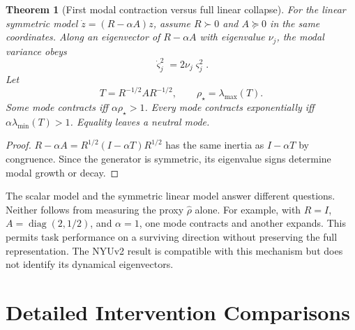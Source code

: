 \documentclass{article}
\newtheorem{theorem}{Theorem}
\begin{document}
\begin{theorem}[First modal contraction versus full linear collapse]\label{thm:spectral}
For the linear symmetric model $\dot z=(R-\alpha A)z$, assume $R\succ0$ and $A\succeq0$ in the same coordinates. Along an eigenvector of $R-\alpha A$ with eigenvalue $\nu_j$, the modal variance obeys
\begin{equation}
\dot\varsigma_j^2=2\nu_j\varsigma_j^2.
\label{eq:modal}
\end{equation}
Let
\begin{equation}
T=R^{-1/2}AR^{-1/2},\qquad \rho_\star=\lambda_{\max}(T).
\label{eq:spectral}
\end{equation}
Some mode contracts iff $\alpha\rho_\star>1$. Every mode contracts exponentially iff $\alpha\lambda_{\min}(T)>1$. Equality leaves a neutral mode.
\end{theorem}
\begin{proof}
$R-\alpha A=R^{1/2}(I-\alpha T)R^{1/2}$ has the same inertia as $I-\alpha T$ by congruence. Since the generator is symmetric, its eigenvalue signs determine modal growth or decay.
\end{proof}


The scalar model and the symmetric linear model answer different questions.
Neither follows from measuring the proxy $\hat\rho$ alone. For example, with
$R=I$, $A=\operatorname{diag}(2,1/2)$, and $\alpha=1$, one mode contracts and
another expands. This permits task performance on a surviving direction
without preserving the full representation. The NYUv2 result is compatible
with this mechanism but does not identify its dynamical eigenvectors.



\section{Detailed Intervention Comparisons}\label{app:intervention_details}


\end{document}
